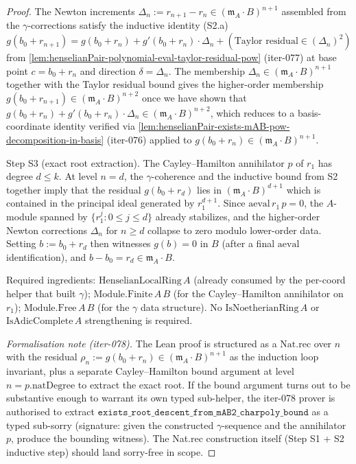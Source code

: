 \begin{proof}
The Newton increments $\Delta_n := r_{n+1} - r_n \in (\mathfrak m_A
\cdot B)^{n+1}$ assembled from the $\gamma$-corrections satisfy
the inductive identity (S2.a)
\[
g(b_0 + r_{n+1}) = g(b_0 + r_n) + g'(b_0 + r_n) \cdot \Delta_n
  + (\text{Taylor residual} \in (\Delta_n)^2)
\]
from \cref{lem:henselianPair-polynomial-eval-taylor-residual-pow}
(iter-077) at base point $c = b_0 + r_n$ and direction $\delta =
\Delta_n$. The membership $\Delta_n \in (\mathfrak m_A \cdot B)^{n+1}$
together with the Taylor residual bound gives the higher-order
membership $g(b_0 + r_{n+1}) \in (\mathfrak m_A \cdot B)^{n+2}$
once we have shown that $g(b_0 + r_n) + g'(b_0 + r_n) \cdot
\Delta_n \in (\mathfrak m_A \cdot B)^{n+2}$, which reduces to a
basis-coordinate identity verified via
\cref{lem:henselianPair-exists-mAB-pow-decomposition-in-basis}
(iter-076) applied to $g(b_0 + r_n) \in (\mathfrak m_A \cdot
B)^{n+1}$.

Step S3 (exact root extraction). The Cayley--Hamilton annihilator
$p$ of $r_1$ has degree $d \le k$. At level $n = d$, the
$\gamma$-coherence and the inductive bound from S2 together imply
that the residual $g(b_0 + r_d)$ lies in
$(\mathfrak m_A \cdot B)^{d+1}$ which is contained in the principal
ideal generated by $r_1^{d+1}$. Since $\mathrm{aeval}\,r_1\,p = 0$,
the $A$-module spanned by $\{r_1^j : 0 \le j \le d\}$ already
stabilizes, and the higher-order Newton corrections $\Delta_n$
for $n \ge d$ collapse to zero modulo lower-order data. Setting
$b := b_0 + r_d$ then witnesses $g(b) = 0$ in $B$ (after a final
$\mathrm{aeval}$ identification), and $b - b_0 = r_d \in \mathfrak
m_A \cdot B$.

Required ingredients: $\mathrm{HenselianLocalRing}\,A$ (already
consumed by the per-coord helper that built $\gamma$);
$\mathrm{Module.Finite}\,A\,B$ (for the Cayley--Hamilton
annihilator on $r_1$); $\mathrm{Module.Free}\,A\,B$ (for the
$\gamma$ data structure). No
$\mathrm{IsNoetherianRing}\,A$ or $\mathrm{IsAdicComplete}\,A$
strengthening is required.

\textit{Formalisation note (iter-078).} The Lean proof is
structured as a $\mathrm{Nat.rec}$ over $n$ with the residual
$\rho_n := g(b_0 + r_n) \in (\mathfrak m_A \cdot B)^{n+1}$ as the
induction loop invariant, plus a separate Cayley--Hamilton bound
argument at level $n = p.\mathrm{natDegree}$ to extract the exact
root. If the bound argument turns out to be substantive enough to
warrant its own typed sub-helper, the iter-078 prover is
authorised to extract
$\texttt{exists\_root\_descent\_from\_mAB2\_charpoly\_bound}$
as a typed sub-sorry (signature: given the constructed
$\gamma$-sequence and the annihilator $p$, produce the bounding
witness). The Nat.rec construction itself (Step S1 + S2 inductive
step) should land sorry-free in scope.
\end{proof}

